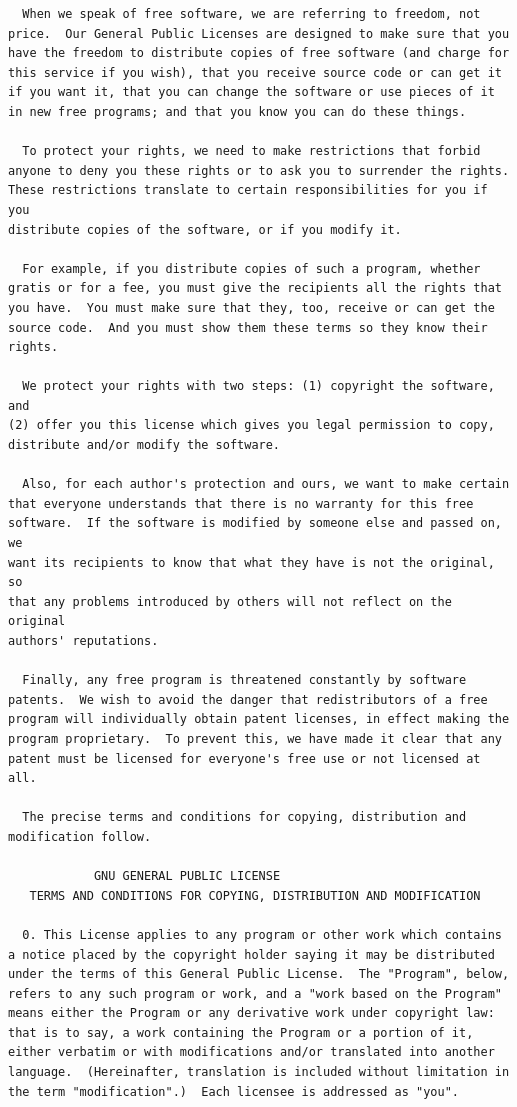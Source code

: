 \documentclass[mingoth,a4paper]{jsarticle}
\begin{document}
{\begin{multicols}{2}
\begin{fontsize}{6}{6}
\begin{verbatim}
  When we speak of free software, we are referring to freedom, not
price.  Our General Public Licenses are designed to make sure that you
have the freedom to distribute copies of free software (and charge for
this service if you wish), that you receive source code or can get it
if you want it, that you can change the software or use pieces of it
in new free programs; and that you know you can do these things.

  To protect your rights, we need to make restrictions that forbid
anyone to deny you these rights or to ask you to surrender the rights.
These restrictions translate to certain responsibilities for you if you
distribute copies of the software, or if you modify it.

  For example, if you distribute copies of such a program, whether
gratis or for a fee, you must give the recipients all the rights that
you have.  You must make sure that they, too, receive or can get the
source code.  And you must show them these terms so they know their
rights.

  We protect your rights with two steps: (1) copyright the software, and
(2) offer you this license which gives you legal permission to copy,
distribute and/or modify the software.

  Also, for each author's protection and ours, we want to make certain
that everyone understands that there is no warranty for this free
software.  If the software is modified by someone else and passed on, we
want its recipients to know that what they have is not the original, so
that any problems introduced by others will not reflect on the original
authors' reputations.

  Finally, any free program is threatened constantly by software
patents.  We wish to avoid the danger that redistributors of a free
program will individually obtain patent licenses, in effect making the
program proprietary.  To prevent this, we have made it clear that any
patent must be licensed for everyone's free use or not licensed at all.

  The precise terms and conditions for copying, distribution and
modification follow.

            GNU GENERAL PUBLIC LICENSE
   TERMS AND CONDITIONS FOR COPYING, DISTRIBUTION AND MODIFICATION

  0. This License applies to any program or other work which contains
a notice placed by the copyright holder saying it may be distributed
under the terms of this General Public License.  The "Program", below,
refers to any such program or work, and a "work based on the Program"
means either the Program or any derivative work under copyright law:
that is to say, a work containing the Program or a portion of it,
either verbatim or with modifications and/or translated into another
language.  (Hereinafter, translation is included without limitation in
the term "modification".)  Each licensee is addressed as "you".


\end{verbatim}
\end{fontsize}
\end{multicols}}
\end{document}
